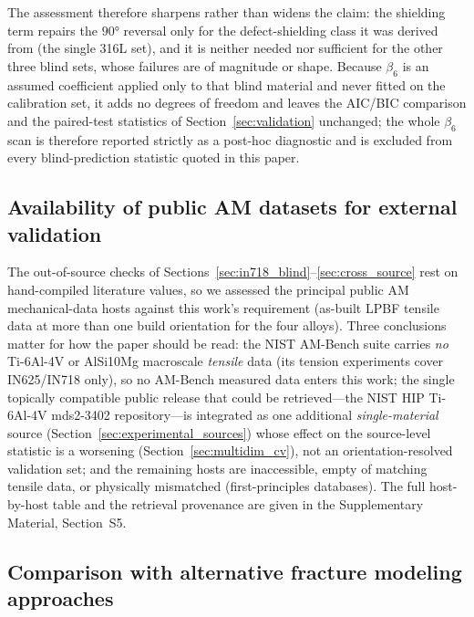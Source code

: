 \documentclass[12pt,a4paper,twocolumn]{article}
\begin{document}
The assessment therefore sharpens rather than widens the claim: the shielding term repairs the $\ang{90}$ reversal only for the defect-shielding class it was derived from (the single 316L set), and it is neither needed nor sufficient for the other three blind sets, whose failures are of magnitude or shape. Because $\beta_6$ is an assumed coefficient applied only to that blind material and never fitted on the calibration set, it adds no degrees of freedom and leaves the AIC/BIC comparison and the paired-test statistics of Section~\ref{sec:validation} unchanged; the whole $\beta_6$ scan is therefore reported strictly as a post-hoc diagnostic and is excluded from every blind-prediction statistic quoted in this paper.


\subsection{Availability of public AM datasets for external validation}
\label{sec:public_datasets}

The out-of-source checks of Sections~\ref{sec:in718_blind}--\ref{sec:cross_source} rest on hand-compiled literature values, so we assessed the principal public AM mechanical-data hosts against this work's requirement (as-built LPBF tensile data at more than one build orientation for the four alloys). Three conclusions matter for how the paper should be read: the NIST AM-Bench suite carries \emph{no} Ti-6Al-4V or AlSi10Mg macroscale \emph{tensile} data (its tension experiments cover IN625/IN718 only), so no AM-Bench measured data enters this work; the single topically compatible public release that could be retrieved---the NIST HIP Ti-6Al-4V mds2-3402 repository---is integrated as one additional \emph{single-material} source (Section~\ref{sec:experimental_sources}) whose effect on the source-level statistic is a worsening (Section~\ref{sec:multidim_cv}), not an orientation-resolved validation set; and the remaining hosts are inaccessible, empty of matching tensile data, or physically mismatched (first-principles databases). The full host-by-host table and the retrieval provenance are given in the Supplementary Material, Section~S5.

\subsection{Comparison with alternative fracture modeling approaches}
\end{document}
